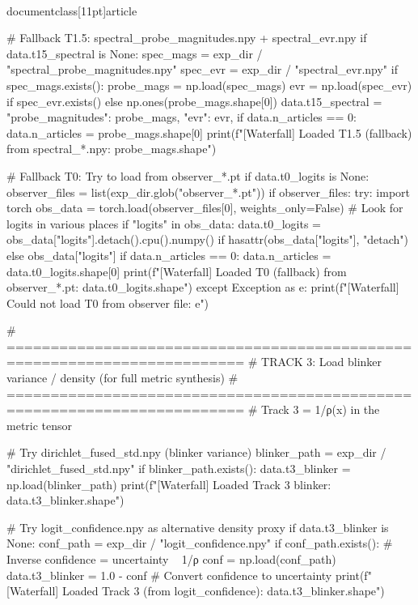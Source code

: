 \\documentclass[11pt]{article}
\begin{document}
\begin{CodeBlock}
    # Fallback T1.5: spectral_probe_magnitudes.npy + spectral_evr.npy
    if data.t15_spectral is None:
        spec_mags = exp_dir / "spectral_probe_magnitudes.npy"
        spec_evr = exp_dir / "spectral_evr.npy"
        if spec_mags.exists():
            probe_mags = np.load(spec_mags)
            evr = np.load(spec_evr) if spec_evr.exists() else np.ones(probe_mags.shape[0])
            data.t15_spectral = {
                "probe_magnitudes": probe_mags,
                "evr": evr,
            }
            if data.n_articles == 0:
                data.n_articles = probe_mags.shape[0]
            print(f"[Waterfall] Loaded T1.5 (fallback) from spectral_*.npy: {probe_mags.shape}")

    # Fallback T0: Try to load from observer_*.pt
    if data.t0_logits is None:
        observer_files = list(exp_dir.glob("observer_*.pt"))
        if observer_files:
            try:
                import torch
                obs_data = torch.load(observer_files[0], weights_only=False)
                # Look for logits in various places
                if "logits" in obs_data:
                    data.t0_logits = obs_data["logits"].detach().cpu().numpy() if hasattr(obs_data["logits"], "detach") else obs_data["logits"]
                    if data.n_articles == 0:
                        data.n_articles = data.t0_logits.shape[0]
                    print(f"[Waterfall] Loaded T0 (fallback) from observer_*.pt: {data.t0_logits.shape}")
            except Exception as e:
                print(f"[Waterfall] Could not load T0 from observer file: {e}")

    # =========================================================================
    # TRACK 3: Load blinker variance / density (for full metric synthesis)
    # =========================================================================
    # Track 3 = 1/ρ(x) in the metric tensor

    # Try dirichlet_fused_std.npy (blinker variance)
    blinker_path = exp_dir / "dirichlet_fused_std.npy"
    if blinker_path.exists():
        data.t3_blinker = np.load(blinker_path)
        print(f"[Waterfall] Loaded Track 3 blinker: {data.t3_blinker.shape}")

    # Try logit_confidence.npy as alternative density proxy
    if data.t3_blinker is None:
        conf_path = exp_dir / "logit_confidence.npy"
        if conf_path.exists():
            # Inverse confidence = uncertainty ~ 1/ρ
            conf = np.load(conf_path)
            data.t3_blinker = 1.0 - conf  # Convert confidence to uncertainty
            print(f"[Waterfall] Loaded Track 3 (from logit_confidence): {data.t3_blinker.shape}")


\end{CodeBlock}
\end{document}
